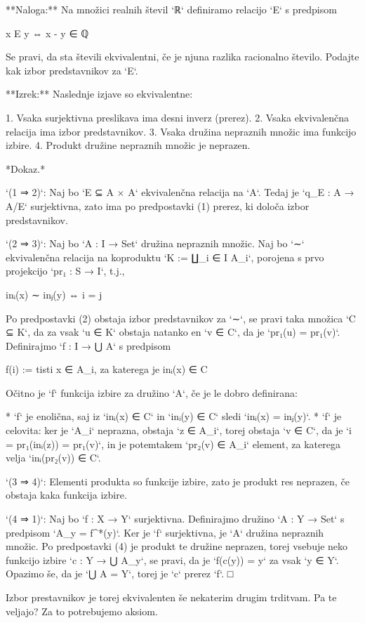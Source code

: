 **Naloga:** Na množici realnih števil `ℝ` definiramo relacijo `E` s predpisom

    x E y  ⇔  x - y ∈ ℚ

Se pravi, da sta števili ekvivalentni, če je njuna razlika racionalno število. Podajte kak
izbor predstavnikov za `E`.


**Izrek:** Naslednje izjave so ekvivalentne:

1. Vsaka surjektivna preslikava ima desni inverz (prerez).
2. Vsaka ekvivalenčna relacija ima izbor predstavnikov.
3. Vsaka družina nepraznih množic ima funkcijo izbire.
4. Produkt družine nepraznih množic je neprazen.

*Dokaz.*

`(1 ⇒ 2)`: Naj bo `E ⊆ A × A` ekvivalenčna relacija na `A`. Tedaj je `q_E : A → A/E`
surjektivna, zato ima po predpostavki (1) prerez, ki določa izbor predstavnikov.

`(2 ⇒ 3)`: Naj bo `A : I → Set` družina nepraznih množic. Naj bo `∼` ekvivalenčna relacija
na koproduktu `K := ∐_{i ∈ I} A_i`, porojena s prvo projekcijo `pr₁ : S → I`, t.j.,

    inᵢ(x) ∼ inⱼ(y) ⇔ i = j

Po predpostavki (2) obstaja izbor predstavnikov za `∼`, se pravi taka množica `C ⊆ K`, da
za vsak `u ∈ K` obstaja natanko en `v ∈ C`, da je `pr₁(u) = pr₁(v)`. Definirajmo `f : I →
⋃ A` s predpisom

    f(i) := tisti x ∈ A_i, za katerega je inᵢ(x) ∈ C

Očitno je `f` funkcija izbire za družino `A`, če je le dobro definirana:

* `f` je enolična, saj iz `inᵢ(x) ∈ C` in `inᵢ(y) ∈ C` sledi `inᵢ(x) = inⱼ(y)`.
* `f` je celovita: ker je `A_i` neprazna, obstaja `z ∈ A_i`, torej obstaja `v ∈ C`, da je
  `i = pr₁(inᵢ(z)) = pr₁(v)`, in je potemtakem `pr₂(v) ∈ A_i` element, za katerega velja
  `inᵢ(pr₂(v)) ∈ C`.

`(3 ⇒ 4)`: Elementi produkta so funkcije izbire, zato je produkt res neprazen, če obstaja
kaka funkcija izbire.

`(4 ⇒ 1)`: Naj bo `f : X → Y` surjektivna. Definirajmo družino `A : Y → Set` s
predpisom `A_y = f^*({y})`. Ker je `f` surjektivna, je `A` družina nepraznih
množic. Po predpostavki (4) je produkt te družine neprazen, torej vsebuje neko
funkcijo izbire `c : Y → ⋃ A_y`, se pravi, da je `f(c(y)) = y` za vsak `y ∈ Y`.
Opazimo še, da je `⋃ A = Y`, torej je `c` prerez `f`. □

Izbor prestavnikov je torej ekvivalenten še nekaterim drugim trditvam. Pa te veljajo? Za
to potrebujemo aksiom.

